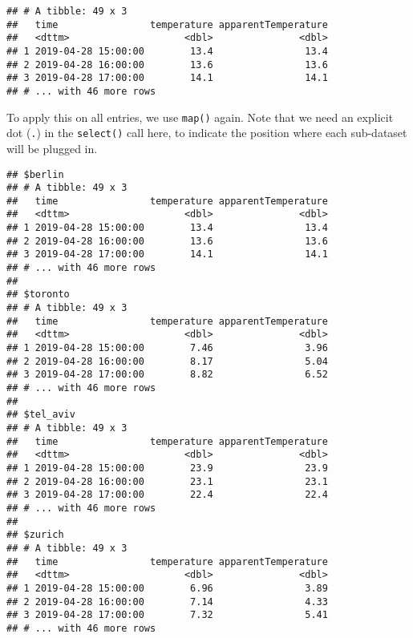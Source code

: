\documentclass[]{book}
\newenvironment{Shaded}{\begin{snugshade}}{\end{snugshade}}
\newcommand{\KeywordTok}[1]{\textcolor[rgb]{0.13,0.29,0.53}{\textbf{#1}}}
\newcommand{\NormalTok}[1]{#1}
\newcommand{\OperatorTok}[1]{\textcolor[rgb]{0.81,0.36,0.00}{\textbf{#1}}}
\newcommand{\StringTok}[1]{\textcolor[rgb]{0.31,0.60,0.02}{#1}}
\begin{document}
\begin{verbatim}
## # A tibble: 49 x 3
##   time                temperature apparentTemperature
##   <dttm>                    <dbl>               <dbl>
## 1 2019-04-28 15:00:00        13.4                13.4
## 2 2019-04-28 16:00:00        13.6                13.6
## 3 2019-04-28 17:00:00        14.1                14.1
## # ... with 46 more rows
\end{verbatim}

To apply this on all entries, we use \texttt{map()} again.
Note that we need an explicit dot (\texttt{.}) in the \texttt{select()} call here, to indicate the position where each sub-dataset will be plugged in.

\begin{Shaded}
\end{Shaded}

\begin{verbatim}
## $berlin
## # A tibble: 49 x 3
##   time                temperature apparentTemperature
##   <dttm>                    <dbl>               <dbl>
## 1 2019-04-28 15:00:00        13.4                13.4
## 2 2019-04-28 16:00:00        13.6                13.6
## 3 2019-04-28 17:00:00        14.1                14.1
## # ... with 46 more rows
## 
## $toronto
## # A tibble: 49 x 3
##   time                temperature apparentTemperature
##   <dttm>                    <dbl>               <dbl>
## 1 2019-04-28 15:00:00        7.46                3.96
## 2 2019-04-28 16:00:00        8.17                5.04
## 3 2019-04-28 17:00:00        8.82                6.52
## # ... with 46 more rows
## 
## $tel_aviv
## # A tibble: 49 x 3
##   time                temperature apparentTemperature
##   <dttm>                    <dbl>               <dbl>
## 1 2019-04-28 15:00:00        23.9                23.9
## 2 2019-04-28 16:00:00        23.1                23.1
## 3 2019-04-28 17:00:00        22.4                22.4
## # ... with 46 more rows
## 
## $zurich
## # A tibble: 49 x 3
##   time                temperature apparentTemperature
##   <dttm>                    <dbl>               <dbl>
## 1 2019-04-28 15:00:00        6.96                3.89
## 2 2019-04-28 16:00:00        7.14                4.33
## 3 2019-04-28 17:00:00        7.32                5.41
## # ... with 46 more rows
\end{verbatim}
\end{document}
